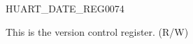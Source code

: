 \begin{register}{H}{UART\_DATE\_REG}{\hexprefix{}0074}\label{regdesc:UARTDATEREG}
%
\regnewline%
\begin{regdesc}\begin{reglist}
\label{fielddesc:UARTDATE}\item [UART\_DATE] This is the version control register. (R/W)
\end{reglist}\end{regdesc}
\end{register}
